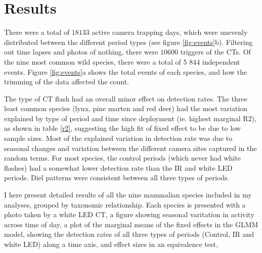 \chapter{Results}



There were a total of $18 133$ active camera trapping days, which were unevenly distributed between the different period types (see figure \ref{fig:events}b). Filtering out time lapses and photos of nothing, there were $10 600$ triggers of the CTs. 
Of the nine most common wild species, there were a total of 5 844 independent events. Figure \ref{fig:events}a shows the total events of each species, and how the trimming of the data affected the count.

The type of CT flash had an overall minor effect on detection rates. 
The three least common species (lynx, pine marten and red deer) had the most variation explained by type of period and time since deployment (ie. highest marginal R2), as shown in table \ref{r2}, suggesting the high fit of fixed effect to be due to low sample sizes.
Most of the explained variation in detection rate was due to seasonal changes and variation between the different camera sites captured in the random terms. %
For most species, the control periods (which never had white flashes) had a somewhat lower detection rate than the IR and white LED periods.
Diel patterns were consistent between all three types of periods.



I here present detailed results of all the nine mammalian species included in my analyses, grouped by taxonomic relationship.
Each species is presented with a photo taken by a white LED CT, 
a figure showing seasonal varitation in activity across time of day, 
a plot of the marginal means of the fixed effects in the GLMM model, showing the detection rates of all three types of periods (Control, IR and white LED) along a time axis,
and effect sizes in an equivalence test, 


